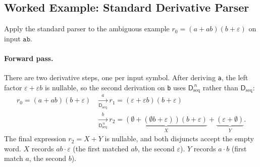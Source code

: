 %
%
%

\subsection{Worked Example: Standard Derivative Parser}
\label{sec:worked-example}
Apply the standard parser to the ambiguous example
$r_0=(a + ab)(b + \varepsilon)$ on input $\texttt{ab}$.

\paragraph{Forward pass.}
There are two derivative steps, one per input symbol. 
After deriving \texttt{a}, the left factor $\varepsilon+\varepsilon b$ is nullable, 
so the second derivation on \texttt{b} uses $\mathsf{D}_{\mathrm{seq}}^{\,n}$ 
rather than $\mathsf{D}_{\mathrm{seq}}$:
\[
\begin{aligned}
r_0 = (a+ab)(b+\varepsilon)
  &\xrightarrow[\mathsf{D}_{\mathrm{seq}}]{a}
    r_1 = (\varepsilon+\varepsilon b)(b+\varepsilon) \\
  &\xrightarrow[\mathsf{D}_{\mathrm{seq}}^{\,n}]{b}
    r_2 = \underbrace{(\emptyset+(\emptyset b+\varepsilon))(b+\varepsilon)}_{X}
       + \underbrace{(\varepsilon+\emptyset)}_{Y}.
\end{aligned}
\]
The final expression $r_2 = X + Y$ is nullable, 
and both disjuncts accept the empty word. 
$X$ records $ab \cdot \varepsilon$ (the first matched $ab$, 
the second $\varepsilon$).
$Y$ records $a \cdot b$ (first match $a$, the second $b$).

%

